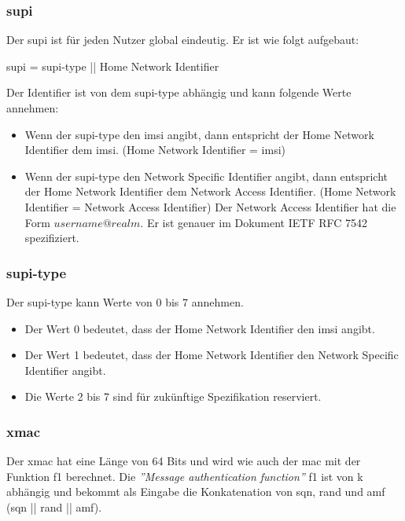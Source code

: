 \subsubsection{\gls{supi}}
Der \gls{supi} ist f\"ur jeden Nutzer global eindeutig. 
Er ist wie folgt aufgebaut: %

\gls{supi} = \gls{supi-type} || Home Network Identifier

Der Identifier ist von dem \gls{supi-type} abh\"angig und kann folgende Werte annehmen:

\begin{itemize}
\item Wenn der \gls{supi-type} den \gls{imsi} angibt, dann entspricht der Home Network Identifier dem \gls{imsi}. (Home Network Identifier = \gls{imsi})
\item Wenn der \gls{supi-type} den Network Specific Identifier angibt, dann entspricht der Home Network Identifier dem Network Access Identifier. (Home Network Identifier = Network Access Identifier)
Der Network Access Identifier hat die Form $ username@realm $. 
Er ist genauer im Dokument IETF RFC 7542 spezifiziert. %
\end{itemize}

\subsubsection{\gls{supi-type}}
Der \gls{supi-type} kann Werte von 0 bis 7 annehmen. %
\begin{itemize}
\item Der Wert 0 bedeutet, dass der Home Network Identifier den \gls{imsi} angibt.
\item Der Wert 1 bedeutet, dass der Home Network Identifier den Network Specific Identifier angibt.
\item Die Werte 2 bis 7 sind f\"ur zuk\"unftige Spezifikation reserviert.
\end{itemize}

\subsubsection{\gls{xmac}}
Der \gls{xmac} hat eine L\"ange von 64 Bits und wird wie auch der \gls{mac} mit der Funktion f1 berechnet. %
Die \textit{''Message authentication function''} f1 ist von \gls{k} abh\"angig und bekommt als Eingabe die Konkatenation von \gls{sqn}, \gls{rand} und \gls{amf} (\gls{sqn} || \gls{rand} || \gls{amf}). %

